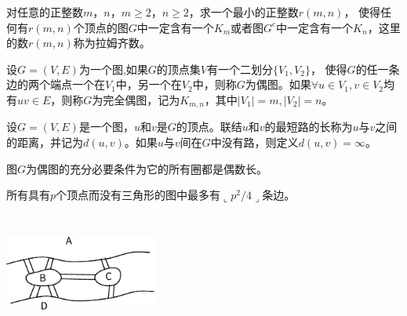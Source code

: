   \begin{Def}
    对任意的正整数$m$，$n$，$m \geq 2$，$n \geq 2$，求一个最小的正整数$r(m,n)$，
    使得任何有$r(m,n)$个顶点的图$G$中一定含有一个$K_m$或者图$G^c$中一定含有一个$K_n$，这里的数$r(m,n)$称为拉姆齐数。
  \end{Def}
  \begin{Def}
    设$G=(V,E)$为一个图,如果$G$的顶点集$V$有一个二划分$\{V_1,V_2\}$，
    使得$G$的任一条边的两个端点一个在$V_1$中，另一个在$V_2$中，则称$G$为偶图。如果$\forall u \in V_1, v \in V_2$均有$uv \in E$，则称$G$为完全偶图，记为$K_{m,n}$，其中$|V_1|=m,|V_2|=n$。
  \end{Def}
    \begin{Def}
    设$G=(V,E)$是一个图，$u$和$v$是$G$的顶点。联结$u$和$v$的最短路的长称为$u$与$v$之间的距离，并记为$d(u,v)$。如果$u$与$v$间在$G$中没有路，则定义$d(u,v)=\infty$。
  \end{Def}

   \begin{Thm}
    图$G$为偶图的充分必要条件为它的所有圈都是偶数长。
  \end{Thm}

    \begin{Thm}
    所有具有$p$个顶点而没有三角形的图中最多有$\llcorner p^2/4\lrcorner$条边。
  \end{Thm}

 \centering
\includegraphics[width=5cm,height=4cm]{konigsberg} 

